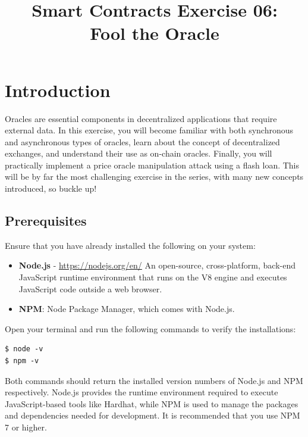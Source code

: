 \documentclass[12pt]{article}
\title{Smart Contracts Exercise 06: \\ Fool the Oracle}
\author{}
\date{}
\begin{document}
\maketitle
\section{Introduction}

Oracles are essential components in decentralized applications that require external data. In this exercise, you will become familiar with both synchronous and asynchronous types of oracles, learn about the concept of decentralized exchanges, and understand their use as on-chain oracles. Finally, you will practically implement a price oracle manipulation attack using a flash loan. This will be by far the most challenging exercise in the series, with many new concepts introduced, so buckle up!

\subsection*{Prerequisites}

Ensure that you have already installed the following on your system:

\begin{itemize}
    \item \textbf{Node.js} - \url{https://nodejs.org/en/}
    An open-source, cross-platform, back-end JavaScript runtime environment that runs on the V8 engine and executes JavaScript code outside a web browser. 
    \item \textbf{NPM}: Node Package Manager, which comes with Node.js.
\end{itemize}

Open your terminal and run the following commands to verify the installations:

\begin{verbatim}
$ node -v
$ npm -v
\end{verbatim}

Both commands should return the installed version numbers of Node.js and NPM respectively. Node.js provides the runtime environment required to execute JavaScript-based tools like Hardhat, while NPM is used to manage the packages and dependencies needed for development. It is recommended that you use NPM 7 or higher.

\end{document}
